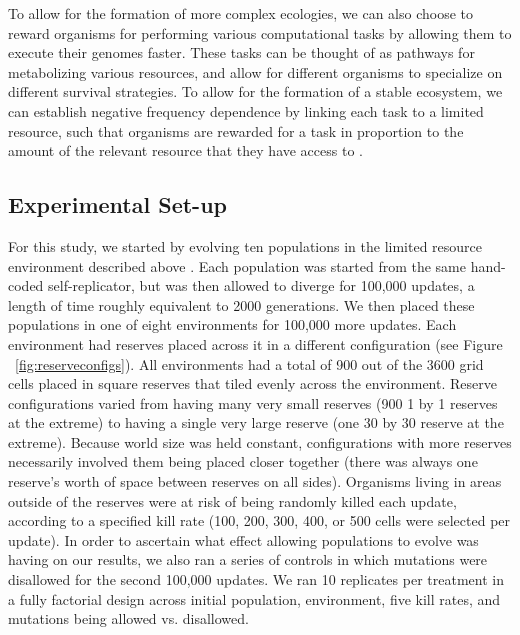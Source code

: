 \documentclass[letterpaper]{article}
\begin{document}
	To allow for the formation of more complex ecologies, we can also choose to reward organisms for performing various computational tasks by allowing them to execute their genomes faster. These tasks can be thought of as pathways for metabolizing various resources, and allow for different organisms to specialize on different survival strategies. To allow for the formation of a stable ecosystem, we can establish negative frequency dependence by linking each task to a limited resource, such that organisms are rewarded for a task in proportion to the amount of the relevant resource that they have access to \citep{chow_adaptive_2004}.
        
\subsection{Experimental Set-up}
        
	For this study, we started by evolving ten populations in the limited resource environment described above \citep{chow_adaptive_2004}. Each population was started from the same hand-coded self-replicator, but was then allowed to diverge for 100,000 updates, a length of time roughly equivalent to 2000 generations. We then placed these populations in one of eight environments for 100,000 more updates. Each environment had reserves placed across it in a different configuration (see Figure ~\ref{fig:reserveconfigs}). All environments had a total of 900 out of the 3600 grid cells placed in square reserves that tiled evenly across the environment. Reserve configurations varied from having many very small reserves (900 1 by 1 reserves at the extreme) to having a single very large reserve (one 30 by 30 reserve at the extreme). Because world size was held constant, configurations with more reserves necessarily involved them being placed closer together (there was always one reserve's worth of space between reserves on all sides). Organisms living in areas outside of the reserves were at risk of being randomly killed each update, according to a specified kill rate (100, 200, 300, 400, or 500 cells were selected per update). In order to ascertain what effect allowing populations to evolve was having on our results, we also ran a series of controls in which mutations were disallowed for the second 100,000 updates. We ran 10 replicates per treatment in a fully factorial design across initial population, environment, five kill rates, and mutations being allowed vs. disallowed.
%
%
%
%
%
%
%
    
\end{document}
